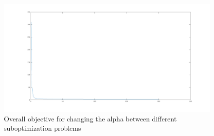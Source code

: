 \documentclass{article}
\newcommand{\0}{\mathrm{0}}
\newcommand{\1}{\mathrm{1}}
\begin{document}
\begin{figure}[H]
    \includegraphics[width=\textwidth]{fixed-step-change-alpha.png}
    \caption{Overall objective for changing the alpha between different suboptimization problems}
\end{figure}
\end{document}
